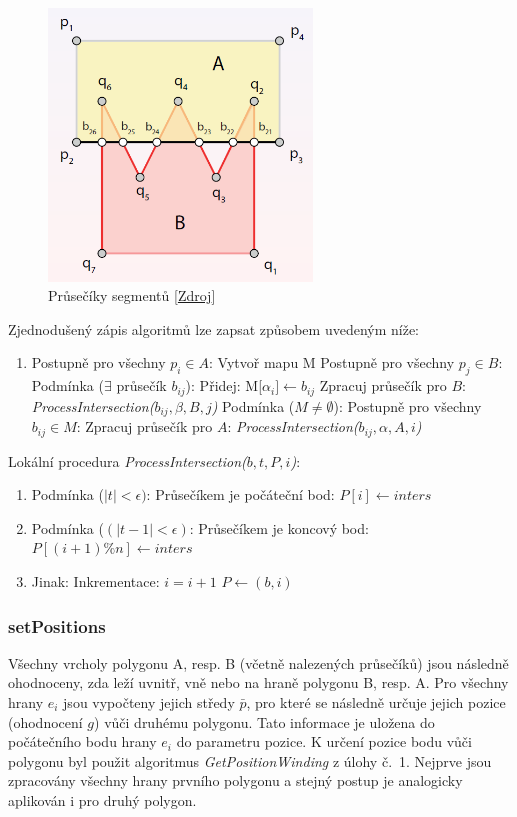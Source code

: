 \documentclass[a4paper, 12pt]{article}
\begin{document}
\begin{figure}[h!]
	\centering
	\includegraphics[width=7cm]{./pictures/doc_intersections.png}
	\caption{Průsečíky segmentů [\href{https://web.natur.cuni.cz/~bayertom/images/courses/Adk/adk9.pdf}{Zdroj}]}
\end{figure}

Zjednodušený zápis algoritmů lze zapsat způsobem uvedeným níže:

\begin{enumerate}
\item[] Postupně pro všechny $p_i \in A$:
\subitem Vytvoř mapu M 
\subitem Postupně pro všechny $p_j \in B$:
\subitem \hspace {0.5cm} Podmínka ($\exists$ průsečík $b_{ij}$):
\subitem \hspace {1cm} Přidej: M[$\alpha_{i}] \leftarrow b_{ij}$
\subitem \hspace {1cm} Zpracuj průsečík pro $B$: \textit{ProcessIntersection($b_{ij}, \beta, B, j$)}
\subitem Podmínka ($M \neq \emptyset$):
\subitem \hspace {0.5cm} Postupně pro všechny $b_{ij} \in M$:
\subitem \hspace {1cm} Zpracuj průsečík pro $A$: \textit{ProcessIntersection($b_{ij}, \alpha, A, i$)}
\end{enumerate}
\clearpage

Lokální procedura \textit{ProcessIntersection($b, t, P, i$)}:
\begin{enumerate}
\item  Podmínka ($|t| < \epsilon)$: 
\subitem Průsečíkem je počáteční bod: $P[i] \leftarrow inters$
\item  Podmínka ($(|t-1| < \epsilon)$:
\subitem Průsečíkem je koncový bod: $P[(i+1)\%n] \leftarrow inters$
\item  Jinak:
\subitem Inkrementace: $i = i+1$
\subitem $P \leftarrow (b,i)$
\end{enumerate}

\subsubsection{setPositions}
Všechny vrcholy polygonu A, resp. B (včetně nalezených průsečíků) jsou následně ohodnoceny, zda leží uvnitř, vně nebo na hraně polygonu B, resp. A. Pro všechny hrany $e_i$ jsou vypočteny jejich středy $\bar{p}$, pro které se následně určuje jejich pozice (ohodnocení $g$) vůči druhému polygonu. Tato informace je uložena do počátečního bodu hrany $e_i$ do parametru pozice. K určení pozice bodu vůči polygonu byl použit algoritmus \textit{GetPositionWinding} z úlohy č.~1. Nejprve jsou zpracovány všechny hrany prvního polygonu a stejný postup je analogicky aplikován i pro druhý polygon. \\
\end{document}
